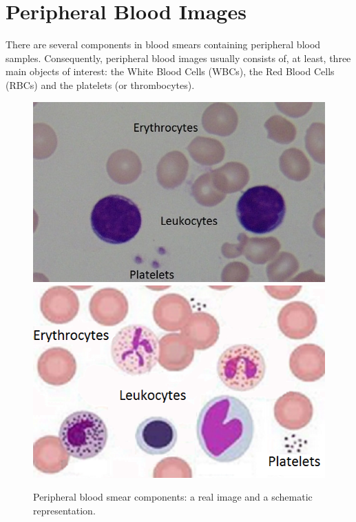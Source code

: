 \documentclass[final,a4paper,12pt,english]{UnicaPhdThesis3}
\begin{document}
	\section{Peripheral Blood Images}
	There are several components in blood smears containing peripheral blood samples. Consequently, peripheral blood images usually consists of, at least, three main objects of interest: the White Blood Cells (\acs{WBC}s), the Red Blood Cells (\acs{RBC}s) and the platelets (or thrombocytes). 
	
	\begin{figure}[!htbp]
		\centering
		\includegraphics[height=0.21\textheight]{images/Cells1}
		\includegraphics[height=0.21\textheight]{images/Cells2}
		\caption{\label{fig:leukocytes} Peripheral blood smear components: a real image and a schematic representation.}
	\end{figure}
	
\end{document}
